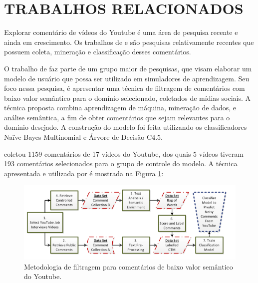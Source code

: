 \section{TRABALHOS RELACIONADOS}

Explorar comentário de vídeos do Youtube é uma área de pesquisa recente e ainda em crescimento. Os trabalhos de  e  são pesquisas relativamente recentes que possuem coleta, mineração e classificação desses comentários.

O trabalho de  faz parte de um grupo maior de pesquisas, que visam elaborar um modelo de usuário que possa ser utilizado em simuladores de aprendizagem. Seu foco nessa pesquisa, é apresentar uma técnica de filtragem de comentários com baixo valor semântico para o domínio selecionado, coletados de mídias sociais. A técnica proposta combina aprendizagem de máquina, mineração de dados, e análise semântica, a fim de obter comentários que sejam relevantes para o domínio desejado. A construção do modelo foi feita utilizando os classificadores Naïve Bayes Multinomial e Árvore de Decisão C4.5.

 coletou 1159 comentários de 17 vídeos do Youtube, dos quais 5 vídeos tiveram 193 comentários selecionados para o grupo de controle do modelo. A técnica apresentada e utilizada por  é mostrada na Figura \ref{fig:ammari-metodologia}:

\begin{figure}[H] %
	\caption{\label{fig:ammari-metodologia} Metodologia de filtragem para comentários de baixo valor semântico do Youtube.}
	\begin{center}
	    \includegraphics[scale=0.8]{figuras/figura_3.PNG} %
	\end{center}
\end{figure}

